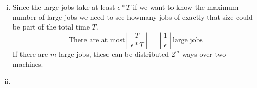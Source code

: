 \begin{enumerate}[(i)]
	\item Since the large jobs take at least $\epsilon * T$ if we want to know the maximum number of large jobs we need to see howmany jobs of exactly that size could be part of the total time $T$. 
\[ \text{There are at most} \left \lfloor\frac{T}{\epsilon * T} \right \rfloor = \left \lfloor \frac{1}{\epsilon} \right \rfloor \text{large jobs} \] 
If there are $m$ large jobs, these can be distributed $2^m$ ways over two machines.
	\item 
\end{enumerate}
